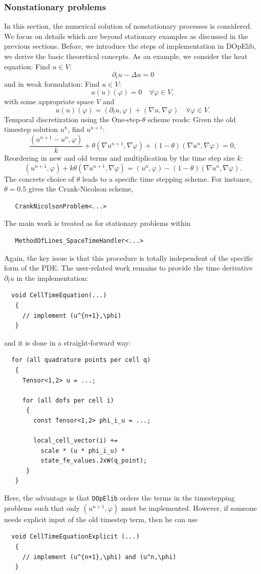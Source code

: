 \documentclass[prodmode,acmtoms]{acmsmall}
\numberwithin{equation}{section}
\renewcommand{\phi}{\varphi}
\newcommand{\dope}{\texttt{DOpElib}}
\begin{document}
\subsubsection{Nonstationary problems}
In this section, the 
numerical solution of nonstationary processes
is considered. We focus on details which are 
beyond stationary examples as discussed in the 
previous sections. Before, we introduce 
the steps of implementation in DOpElib, we 
derive the basic theoretical concepts.
As an example, we consider the heat equation:
Find $u\in V$:
\[
\partial_t u - \Delta u = 0
\]
and in weak formulation:
Find $u\in V$:
\[
a(u)(\phi) = 0 \quad \forall \phi \in V,
\]
with some appropriate space $V$ and 
\[
a(u)(\phi) = (\partial_t u, \phi) + (\nabla u, \nabla \phi) \quad \forall \phi \in V.
\]
Temporal discretization using the One-step-$\theta$ scheme reads:
Given the old timestep solution $u^n$, find $u^{n+1}$:
\[
\frac{(u^{n+1} - u^{n}, \phi)}{k} + \theta (\nabla u^{n+1}, \nabla \phi)
+ (1 - \theta) (\nabla u^{n}, \nabla \phi) = 0,
\]
Reordering in new and old terms and multiplication by the time step size $k$:
\[
(u^{n+1},\phi) + k \theta (\nabla u^{n+1}, \nabla \phi)
= (u^n, \phi) - (1 - \theta) (\nabla u^{n}, \nabla \phi).
\]
The concrete choice of $\theta$ leads to a
specific time stepping scheme. For instance,
$\theta = 0.5$ gives the Crank-Nicolson scheme,
\begin{lstlisting}
   CrankNicolsonProblem<...>
\end{lstlisting}
The main work is treated as for stationary problems
within 
\begin{lstlisting}
   MethodOfLines_SpaceTimeHandler<...>
\end{lstlisting}
Again, the key issue is that this procedure is totally independent 
of the specific form of the PDE. The user-related work 
remains to provide the time derivative $\partial_t u$ in
the implementation:
\begin{lstlisting}
  void CellTimeEquation(...)
   {
     // implement (u^{n+1},\phi) 
   }
\end{lstlisting}
and it is done in a straight-forward way:
\begin{lstlisting}
  for (all quadrature points per cell q)
   {
     Tensor<1,2> u = ...;

     for (all dofs per cell i)
      {
        const Tensor<1,2> phi_i_u = ...;

        local_cell_vector(i) +=  
          scale * (u * phi_i_u) * 
          state_fe_values.JxW(q_point);
      }
   }
\end{lstlisting}
Here, the advantage is that \dope{} orders the terms in the timestepping
problems
such that only $(u^{n+1},\phi)$ must be implemented. However, if someone 
needs explicit input of the old timestep term, then he can use 
\begin{lstlisting}
  void CellTimeEquationExplicit (...)
   {
     // implement (u^{n+1},\phi) and (u^n,\phi)  
   }
\end{lstlisting}
\end{document}
